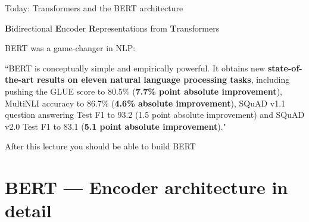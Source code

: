 \documentclass[12pt,aspectratio=169,handout]{beamer}
\begin{document}
\begin{frame}{Today: Transformers and the BERT architecture}

\textbf{B}idirectional \textbf{E}ncoder \textbf{R}epresentations from \textbf{T}ransformers

BERT was a game-changer in NLP:

\begin{small}
``BERT is conceptually simple and empirically powerful. It obtains new \textbf{state-of-the-art results on eleven natural language processing tasks}, including pushing the GLUE score to 80.5\% (\textbf{7.7\% point absolute improvement}), MultiNLI accuracy to 86.7\% (\textbf{4.6\% absolute improvement}), SQuAD v1.1 question answering Test F1 to 93.2 (1.5 point absolute improvement) and SQuAD v2.0 Test F1 to 83.1 (\textbf{5.1 point absolute improvement})."
\end{small}

After this lecture you should be able to build BERT



\end{frame}




\section{BERT --- Encoder architecture in detail}
\end{document}
